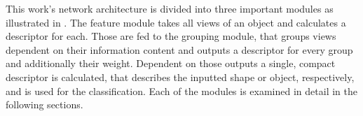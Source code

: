 This work's network architecture is divided into three important modules as illustrated in .
The feature module takes all views of an object and calculates a descriptor for each.
Those are fed to the grouping module, that groups views dependent on their information content and outputs a descriptor for every group and additionally their weight.
Dependent on those outputs a single, compact descriptor is calculated, that describes the inputted shape or object, respectively, and is used for the classification.
Each of the modules is examined in detail in the following sections.
